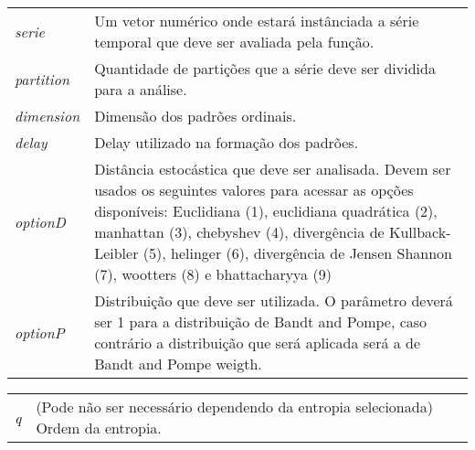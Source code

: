 \documentclass[12pt,letterpaper]{article}
\begin{document}
\begin{table}[!h]
\begin{center}
\begin{tabularx}{\textwidth}{X X}
\hspace{0.5cm} \textit{serie} \vspace{0.5cm}& Um vetor numérico onde estará instânciada a série temporal que deve ser avaliada pela função.\vspace{0.5cm}\\
\hspace{0.5cm} \textit{partition} \vspace{0.5cm}& Quantidade de partições que a série deve ser dividida para a análise.\vspace{0.5cm}\\
\hspace{0.5cm} \textit{dimension} \vspace{0.5cm}& Dimensão dos padrões ordinais.\vspace{0.5cm}\\
\hspace{0.5cm} \textit{delay} \vspace{0.5cm}& Delay utilizado na formação dos padrões.\vspace{0.5cm}\\
\hspace{0.5cm} \textit{optionD} \vspace{0.5cm}& Distância estocástica que deve ser analisada. Devem ser usados os seguintes valores para acessar as opções disponíveis: Euclidiana (1), euclidiana quadrática (2), manhattan (3), chebyshev (4), divergência de Kullback-Leibler (5), helinger (6), divergência de Jensen Shannon (7), wootters (8) e bhattacharyya (9)\vspace{0.5cm}\\
\hspace{0.5cm} \textit{optionP} \vspace{0.5cm}& Distribuição que deve ser utilizada. O parâmetro deverá ser 1 para a distribuição de Bandt and Pompe, caso contrário a distribuição que será aplicada será a de Bandt and Pompe weigth.\vspace{0.5cm}\\
\end{tabularx}
\end{center}
\end{table} 

\begin{table}[!h]
\begin{center}
\begin{tabularx}{\textwidth}{X X}
\hspace{0.5cm} \textit{q} \vspace{0.5cm}& (Pode não ser necessário dependendo da entropia selecionada) Ordem da entropia.\vspace{0.5cm}\\
\end{tabularx}
\end{center}
\end{table} 
\end{document}
